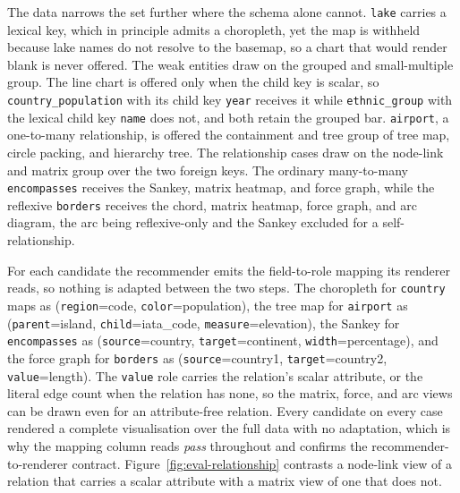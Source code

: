 The data narrows the set further where the schema alone cannot. \texttt{lake} carries a lexical key, which in principle admits a choropleth, yet the map is withheld because lake names do not resolve to the basemap, so a chart that would render blank is never offered. The weak entities draw on the grouped and small-multiple group. The line chart is offered only when the child key is scalar, so \texttt{country\_population} with its child key \texttt{year} receives it while \texttt{ethnic\_group} with the lexical child key \texttt{name} does not, and both retain the grouped bar. \texttt{airport}, a one-to-many relationship, is offered the containment and tree group of tree map, circle packing, and hierarchy tree. The relationship cases draw on the node-link and matrix group over the two foreign keys. The ordinary many-to-many \texttt{encompasses} receives the Sankey, matrix heatmap, and force graph, while the reflexive \texttt{borders} receives the chord, matrix heatmap, force graph, and arc diagram, the arc being reflexive-only and the Sankey excluded for a self-relationship.

For each candidate the recommender emits the field-to-role mapping its renderer reads, so nothing is adapted between the two steps. The choropleth for \texttt{country} maps as (\texttt{region}=code, \texttt{color}=population), the tree map for \texttt{airport} as (\texttt{parent}=island, \texttt{child}=iata\_code, \texttt{measure}=elevation), the Sankey for \texttt{encompasses} as (\texttt{source}=country, \texttt{target}=continent, \texttt{width}=percentage), and the force graph for \texttt{borders} as (\texttt{source}=country1, \texttt{target}=country2, \texttt{value}=length). The \texttt{value} role carries the relation's scalar attribute, or the literal edge count when the relation has none, so the matrix, force, and arc views can be drawn even for an attribute-free relation. Every candidate on every case rendered a complete visualisation over the full data with no adaptation, which is why the mapping column reads \emph{pass} throughout and confirms the recommender-to-renderer contract. Figure~\ref{fig:eval-relationship} contrasts a node-link view of a relation that carries a scalar attribute with a matrix view of one that does not.



